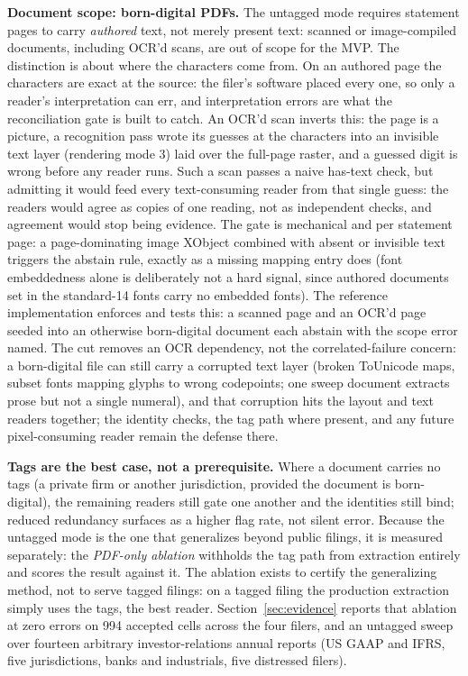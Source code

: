 \documentclass[11pt]{article}
\newcommand{\lead}[2]{\par\addvspace{5pt}\textbf{\textcolor{#1}{#2}}}
\begin{document}
\lead{navytwo}{Document scope: born-digital PDFs.} The untagged mode requires statement pages to carry \emph{authored} text, not merely present text: scanned or image-compiled documents, including OCR'd scans, are out of scope for the MVP. The distinction is about where the characters come from. On an authored page the characters are exact at the source: the filer's software placed every one, so only a reader's interpretation can err, and interpretation errors are what the reconciliation gate is built to catch. An OCR'd scan inverts this: the page is a picture, a recognition pass wrote its guesses at the characters into an invisible text layer (rendering mode 3) laid over the full-page raster, and a guessed digit is wrong before any reader runs. Such a scan passes a naive has-text check, but admitting it would feed every text-consuming reader from that single guess: the readers would agree as copies of one reading, not as independent checks, and agreement would stop being evidence. The gate is mechanical and per statement page: a page-dominating image XObject combined with absent or invisible text triggers the abstain rule, exactly as a missing mapping entry does (font embeddedness alone is deliberately not a hard signal, since authored documents set in the standard-14 fonts carry no embedded fonts). The reference implementation enforces and tests this: a scanned page and an OCR'd page seeded into an otherwise born-digital document each abstain with the scope error named. The cut removes an OCR dependency, not the correlated-failure concern: a born-digital file can still carry a corrupted text layer (broken ToUnicode maps, subset fonts mapping glyphs to wrong codepoints; one sweep document extracts prose but not a single numeral), and that corruption hits the layout and text readers together; the identity checks, the tag path where present, and any future pixel-consuming reader remain the defense there.

\lead{navytwo}{Tags are the best case, not a prerequisite.} Where a document carries no tags (a private firm or another jurisdiction, provided the document is born-digital), the remaining readers still gate one another and the identities still bind; reduced redundancy surfaces as a higher flag rate, not silent error. Because the untagged mode is the one that generalizes beyond public filings, it is measured separately: the \emph{PDF-only ablation} withholds the tag path from extraction entirely and scores the result against it. The ablation exists to certify the generalizing method, not to serve tagged filings: on a tagged filing the production extraction simply uses the tags, the best reader. Section~\ref{sec:evidence} reports that ablation at zero errors on 994 accepted cells across the four filers, and an untagged sweep over fourteen arbitrary investor-relations annual reports (US GAAP and IFRS, five jurisdictions, banks and industrials, five distressed filers).
\end{document}
